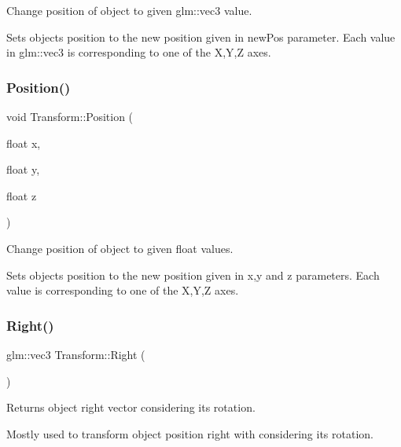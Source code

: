 Change position of object to given glm\+::vec3 value. 

Sets object\textquotesingle{}s position to the new position given in new\+Pos parameter. Each value in glm\+::vec3 is corresponding to one of the X,Y,Z axes. \mbox{\label{class_transform_a8d24b66e54f0489c03389a6424f0bb21}} 
\subsubsection{\texorpdfstring{Position()}{Position()}\hspace{0.1cm}{\footnotesize\ttfamily [3/3]}}
{\footnotesize\ttfamily void Transform\+::\+Position (\begin{DoxyParamCaption}\item[{float}]{x,  }\item[{float}]{y,  }\item[{float}]{z }\end{DoxyParamCaption})\hspace{0.3cm}{\ttfamily [inline]}}



Change position of object to given float values. 

Sets object\textquotesingle{}s position to the new position given in x,y and z parameters. Each value is corresponding to one of the X,Y,Z axes. \mbox{\label{class_transform_ad8a1ed0e1024d93a8722e6d1b8e886c8}} 
\subsubsection{\texorpdfstring{Right()}{Right()}}
{\footnotesize\ttfamily glm\+::vec3 Transform\+::\+Right (\begin{DoxyParamCaption}{ }\end{DoxyParamCaption})\hspace{0.3cm}{\ttfamily [inline]}}



Returns object right vector considering it\textquotesingle{}s rotation. 

Mostly used to transform object position right with considering it\textquotesingle{}s rotation. \mbox{\label{class_transform_a4d1718230fdc4dd8f3a0cf810cf223f4}} 
